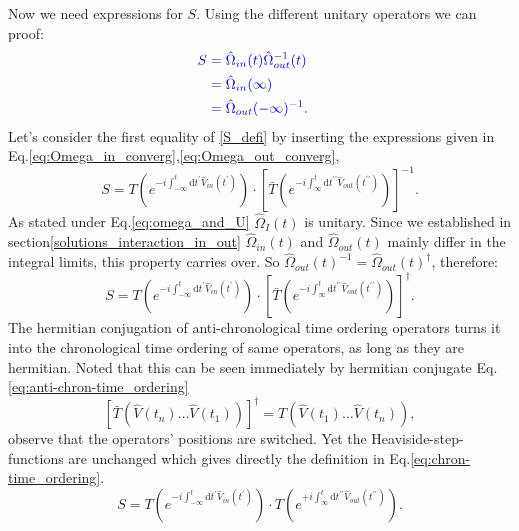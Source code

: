 \documentclass[12pt, titlepage]{article}
\begin{document}
Now we need expressions for $ S $. Using the different unitary operators we can proof:
\begin{subequations}\label{S_defi}
\textcolor[RGB]{0,0,204}{
\begin{align}
	S&=
	\hat{\Omega}_{in}(t)\hat{\Omega}^{-1}_{out}(t)
	&\\
	&=\hat{\Omega}_{in}(\infty)
	&\\
	&=\hat{\Omega}_{out}(-\infty)^{-1}
	.
\end{align}
}
\end{subequations}
Let's consider the first equality of \eqref{S_defi} by inserting the expressions given in Eq.\enskip\eqref{eq:Omega_in_converg},\eqref{eq:Omega_out_converg},
\begin{equation}
S=T\left( e^{-i\int_{-\infty}^{t}\mathrm{d}t^{\prime} \hat{V}_{in}(t^{\prime})} \right)
	\cdot
	\left[ 
	\bar{T}\left( e^{-i\int_{\infty}^{t}\mathrm{d}t^{\prime \prime} \hat{V}_{out}(t^{\prime \prime})} \right)
\right]^{-1}	
	.
\end{equation}
As stated under Eq.\enskip\eqref{eq:omega_and_U} $ \hat{\Omega}_{I}(t) $ is unitary. Since we established in section\ref{solutions_interaction_in_out} $ \hat{\Omega}_{in}(t) $ and $ \hat{\Omega}_{out}(t) $ mainly differ in the integral limits, this property carries over. So $ \hat{\Omega}_{out}(t)^{-1}=\hat{\Omega}_{out}(t)^{\dagger} $, therefore:
\begin{equation}
S=T\left( e^{-i\int_{-\infty}^{t}\mathrm{d}t^{\prime} \hat{V}_{in}(t^{\prime})} \right)
	\cdot
	\left[ 
	\bar{T}\left( e^{-i\int_{\infty}^{t}\mathrm{d}t^{\prime \prime} \hat{V}_{out}(t^{\prime \prime})} \right)
\right]^{\dagger}
	.
\end{equation}
The hermitian conjugation of anti-chronological time ordering operators turns it into the chronological time ordering of same operators, as long as they are hermitian. Noted that this can be seen immediately by hermitian conjugate Eq.\enskip\eqref{eq:anti-chron-time_ordering}
\begin{equation}
\left[
\bar{T}(\hat{V}(t_{n})\ldots\hat{V}(t_{1}))
\right]^{\dagger}
=T(\hat{V}(t_{1})\ldots\hat{V}(t_{n}))
,
\end{equation}
observe that the operators' positions are switched. Yet the Heaviside-step-functions are unchanged which gives directly the definition in Eq.\enskip\eqref{eq:chron-time_ordering}.
\begin{equation}
S=T\left( e^{-i\int_{-\infty}^{t}\mathrm{d}t^{\prime} \hat{V}_{in}(t^{\prime})} \right)
	\cdot
	T\left( e^{+i\int_{\infty}^{t}\mathrm{d}t^{\prime \prime} \hat{V}_{out}(t^{\prime \prime})} \right)
	.
\end{equation}
\end{document}
